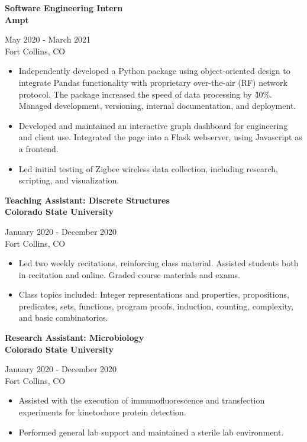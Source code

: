 \documentclass{article}
\newcommand{\resumeSubheading}[5]{
\noindent\begin{minipage}{0.5\textwidth}
	\begin{flushleft}
	\textbf{#1}\\
	\textbf{#2}\\
	\end{flushleft}
\end{minipage}%
\hfill
\begin{minipage}{0.5\textwidth}
	\begin{flushright}
	#3\\
	#4\\
	\end{flushright}
\end{minipage}%
\newline
#5
}
\begin{document}
\resumeSubheading{Software Engineering Intern}{Ampt}{May 2020 - March 2021}{Fort Collins, CO}{
\begin{itemize}

\item Independently developed a Python package using object-oriented design to
	integrate Pandas functionality with proprietary over-the-air (RF)
	network protocol. The package increased the speed of data processing by
	\~40\%. Managed development, versioning, internal documentation, and
	deployment. 

\item Developed and maintained an interactive graph dashboard for engineering
	and client use. Integrated the page into a Flask webserver, using
	Javascript as a frontend.

\item Led initial testing of Zigbee wireless data collection, including
	research, scripting, and visualization.

\end{itemize}
}

\resumeSubheading{Teaching Assistant: Discrete Structures}{Colorado State University}{January 2020 - December 2020}{Fort Collins, CO}{
\begin{itemize}

\item Led two weekly recitations, reinforcing class material.
	Assisted students both in recitation and online. Graded course
	materials and exams. 

\item Class topics included: Integer representations and properties,
	propositions, predicates, sets, functions, program proofs, induction,
	counting, complexity, and basic combinatorics.

\end{itemize}
}

\resumeSubheading{Research Assistant: Microbiology}{Colorado State University}{January 2020 - December 2020}{Fort Collins, CO}{
\begin{itemize}
	\item Assisted with the execution of immunofluorescence and
		transfection experiments for kinetochore protein detection.
	\item Performed general lab support and maintained a sterile lab environment.
\end{itemize}
}
\end{document}
